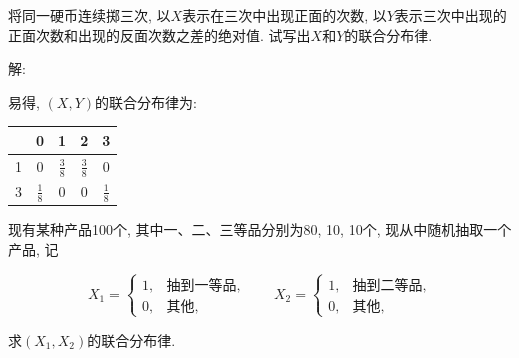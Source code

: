 \documentclass[standard]{ExBook}
\begin{document}
\begin{qitems}
\vspace{-5em}

    \begin{bbox}
    \begin{shaded}
        \qitem
将同一硬币连续掷三次, 以$X$表示在三次中出现正面的次数, 以$Y$表示三次中出现的正面次数和出现的反面次数之差的绝对值. 试写出$X$和$Y$的联合分布律.
    \end{shaded}
    \end{bbox}

\vspace{-5em}

    \begin{bbox}
解: 

易得, $(X,Y)$的联合分布律为:
\begin{footnotesize}
\begin{center}
    \renewcommand{\arraystretch}{1.5}
    \setlength{\tabcolsep}{25pt}
    \begin{tabular}{c|c|c|c|c}
	    \hline
	    \diagbox{$Y$}{$P(X,Y)$}{$X$} & 0 & 1 & 2 & 3 \\
	    \hline
	    1 & 0 & $\displaystyle\frac{3}{8}$ & $\displaystyle\frac{3}{8}$ & 0 \\
	    \hline
	    3 & $\displaystyle\frac{1}{8}$ & 0 & 0 & $\displaystyle\frac{1}{8}$\\
	    \hline
    \end{tabular}
\end{center}
\end{footnotesize}
    \end{bbox}

\vspace{-5em}

    \begin{bbox}
    \begin{shaded}
        \qitem
现有某种产品100个, 其中一、二、三等品分别为80, 10, 10个, 现从中随机抽取一个产品, 记
\vspace{-2em}
\begin{center}
\begin{equation}
    X_1=
    \left\{
    \begin{array}{cl}
        \nonumber
        1, &\text{抽到一等品},\\
        0, &\text{其他},
    \end{array}
    \right.
    \qquad
    X_2=
    \left\{
    \begin{array}{cl}
        \nonumber
        1, &\text{抽到二等品},\\
        0, &\text{其他},
    \end{array}
    \right.
\end{equation}
\end{center}
求$(X_1,X_2)$的联合分布律.
    \end{shaded}
    \end{bbox}


\end{qitems}
\end{document}
